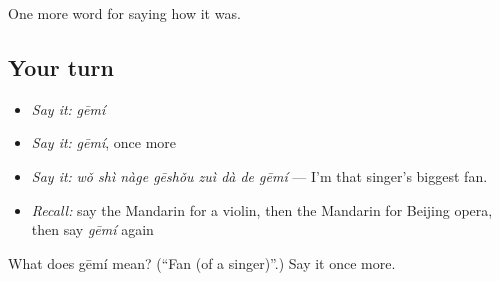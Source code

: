 \begin{grammarlens}[title={What you've built}]
One more word for saying how it was.
\end{grammarlens}

\subsection*{Your turn}
\begin{itemize}
\raggedright
  \item \emph{Say it:} \emph{gēmí}
  \item \emph{Say it:} \emph{gēmí}, once more
  \item \emph{Say it:} \emph{wǒ shì nàge gēshǒu zuì dà de gēmí} — I'm that singer's biggest fan.
  \item \emph{Recall:} say the Mandarin for a violin, then the Mandarin for Beijing opera, then say \emph{gēmí} again
\end{itemize}

\begin{tcolorbox}[breakable,colback=teal!4,colframe=teal!35!black,title={Before you move on}]
What does gēmí mean? (\textquotedblleft{}Fan (of a singer)\textquotedblright{}.) Say it once more.
\end{tcolorbox}
